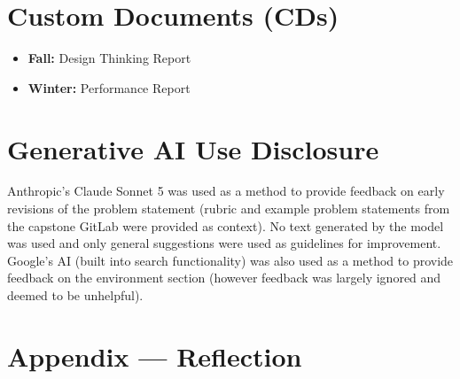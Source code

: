 \documentclass{article}
\begin{document}
\section{Custom Documents (CDs)}

\begin{itemize}
    \item \textbf{Fall:} Design Thinking Report
    \item \textbf{Winter:} Performance Report
\end{itemize}

\section{Generative AI Use Disclosure}
Anthropic's Claude Sonnet 5 was used as a method to provide feedback on early revisions of the problem statement (rubric and example problem statements from the capstone GitLab were provided as context). No text generated by the model was used and only general suggestions were used as guidelines for improvement.
Google's AI (built into search functionality) was also used as a method to provide feedback on the environment section (however feedback was largely ignored and deemed to be unhelpful).

\newpage{}

\section*{Appendix --- Reflection}


\end{document}
